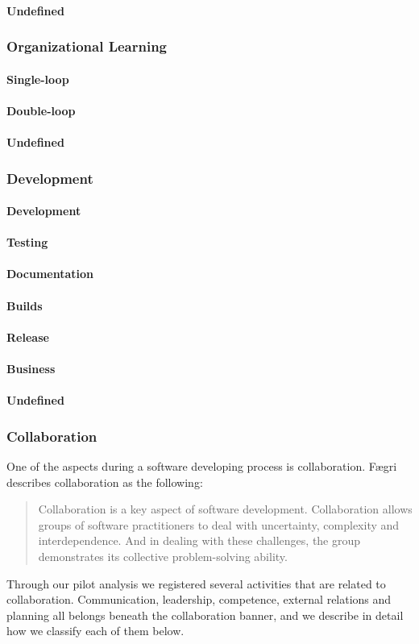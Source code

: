 \paragraph{Undefined}
\subsubsection{Organizational Learning}
\paragraph{Single-loop}
\paragraph{Double-loop}
\paragraph{Undefined}
\subsubsection{Development}
\paragraph{Development}
\paragraph{Testing}
\paragraph{Documentation}
\paragraph{Builds}
\paragraph{Release}
\paragraph{Business}
\paragraph{Undefined}
\subsubsection{Collaboration}
One of the aspects during a software developing process is collaboration. Fægri ~\cite{Faegri2012} describes collaboration as the following: 
\begin{quote}
Collaboration is a key aspect of software development. Collaboration allows groups of software practitioners to deal with uncertainty, complexity and interdependence. And in dealing with these challenges, the group demonstrates its collective problem-solving ability.
\end{quote}
Through our pilot analysis we registered several activities that are related to collaboration. Communication, leadership, competence, external relations and planning all belongs beneath the collaboration banner, and we describe in detail how we classify each of them below. 
